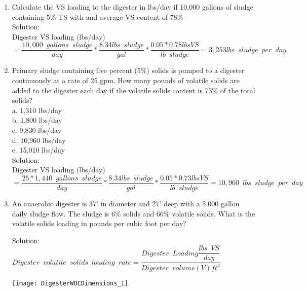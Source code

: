 \begin{enumerate}
\vspace{0.25cm}
\item Calculate the VS loading to the digester in lbs/day if 10,000 gallons of sludge containing 5\% TS with and average VS content of 78\%\\
Solution:\\
Digester VS loading (lbs/day)\\$=\dfrac{10,000 \enspace gallons \enspace sludge}{day}*\dfrac{8.34lbs \enspace sludge}{gal}*\dfrac{0.05*0.78lbs VS}{lb \enspace sludge}=\boxed{3,253lbs \enspace sludge \enspace per \enspace day}$

\item Primary sludge containing five percent (5\%) solids is pumped to a digester continuously at a rate of 25 gpm. How many pounds of volatile solids are added to the digester each day if the volatile solids content is 73\% of the total solids?\\
a. 1,310 lbs/day \\
b. 1,800 lbs/day \\
c. 9,830 lbs/day \\
d. 10,960 lbs/day \\
e. 15,010 lbs/day \\
\vspace{0.25cm}
Solution:\\
\vspace{0.25cm}
Digester VS loading (lbs/day)\\$=\dfrac{25*1,440 \enspace gallons \enspace sludge}{day}*\dfrac{8.34lbs \enspace sludge}{gal}*\dfrac{0.05*0.73lbs VS}{lb \enspace sludge}=\boxed{10,960 \enspace lbs \enspace sludge \enspace per \enspace day}$\\
\vspace{0.25cm}






\item An anaerobic digester is 37’ in diameter and 27’ deep with a 5,000 gallon daily sludge flow. The sludge is 6\% solids and 66\% volatile solids.  What is the volatile solids loading in pounds per cubic foot per day?
	
	
Solution:\\
{
$
	Digester \enspace volatile \enspace solids 			\enspace loading \enspace rate = 					\dfrac
	{
	Digester \enspace Loading 
		\dfrac
		{
		lbs \enspace VS
		}
		{
		day
		}
	}
	{
	Digester \enspace volume (V)ft^3
	}
$
}\\
\begin{center}
\texttt{[image: DigesterWOCDimensions\_1]}
\end{center}


\end{enumerate}
